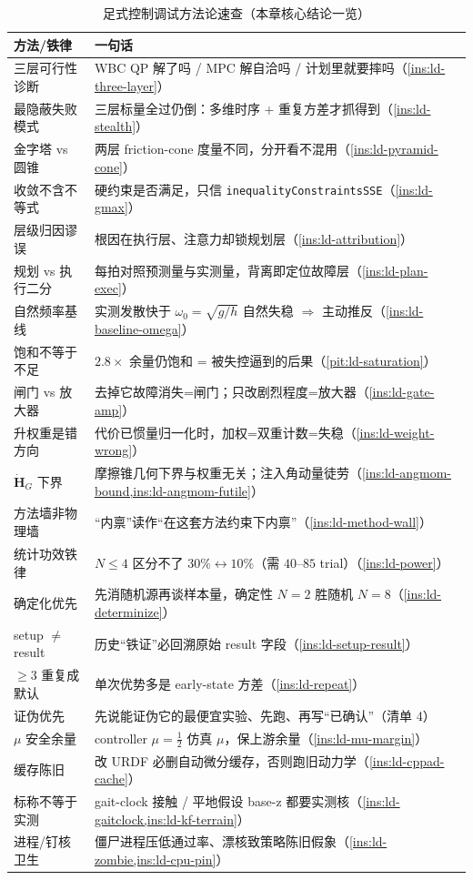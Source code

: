 \begin{table}[H]\centering\small
\caption{足式控制调试方法论速查（本章核心结论一览）}
\begin{tabular}{p{} p{}}
\toprule
方法/铁律 & 一句话 \\
\midrule
三层可行性诊断 & WBC QP 解了吗 / MPC 解自洽吗 / 计划里就要摔吗（\cref{ins:ld-three-layer}）\\
最隐蔽失败模式 & 三层标量全过仍倒：多维时序 + 重复方差才抓得到（\cref{ins:ld-stealth}）\\
金字塔 vs 圆锥 & 两层 friction-cone 度量不同，分开看不混用（\cref{ins:ld-pyramid-cone}）\\
收敛不含不等式 & 硬约束是否满足，只信 \texttt{inequalityConstraintsSSE}（\cref{ins:ld-gmax}）\\
层级归因谬误 & 根因在执行层、注意力却锁规划层（\cref{ins:ld-attribution}）\\
规划 vs 执行二分 & 每拍对照预测量与实测量，背离即定位故障层（\cref{ins:ld-plan-exec}）\\
自然频率基线 & 实测发散快于 $\omega_0=\sqrt{g/h}$ 自然失稳 $\Rightarrow$ 主动推反（\cref{ins:ld-baseline-omega}）\\
饱和不等于不足 & $2.8\times$ 余量仍饱和 = 被失控逼到的后果（\cref{pit:ld-saturation}）\\
闸门 vs 放大器 & 去掉它故障消失=闸门；只改剧烈程度=放大器（\cref{ins:ld-gate-amp}）\\
升权重是错方向 & 代价已惯量归一化时，加权=双重计数=失稳（\cref{ins:ld-weight-wrong}）\\
$\dot{\boldsymbol H}_G$ 下界 & 摩擦锥几何下界与权重无关；注入角动量徒劳（\cref{ins:ld-angmom-bound,ins:ld-angmom-futile}）\\
方法墙非物理墙 & “内禀”读作“在这套方法约束下内禀”（\cref{ins:ld-method-wall}）\\
统计功效铁律 & $N\le 4$ 区分不了 $30\%{\leftrightarrow}10\%$（需 $40$--$85$ trial）（\cref{ins:ld-power}）\\
确定化优先 & 先消随机源再谈样本量，确定性 $N{=}2$ 胜随机 $N{=}8$（\cref{ins:ld-determinize}）\\
setup $\ne$ result & 历史“铁证”必回溯原始 result 字段（\cref{ins:ld-setup-result}）\\
$\ge 3$ 重复成默认 & 单次优势多是 early-state 方差（\cref{ins:ld-repeat}）\\
证伪优先 & 先说能证伪它的最便宜实验、先跑、再写“已确认”（清单 4）\\
$\mu$ 安全余量 & controller $\mu=\tfrac12$ 仿真 $\mu$，保上游余量（\cref{ins:ld-mu-margin}）\\
缓存陈旧 & 改 URDF 必删自动微分缓存，否则跑旧动力学（\cref{ins:ld-cppad-cache}）\\
标称不等于实测 & gait-clock 接触 / 平地假设 base-z 都要实测核（\cref{ins:ld-gaitclock,ins:ld-kf-terrain}）\\
进程/钉核卫生 & 僵尸进程压低通过率、漂核致策略陈旧假象（\cref{ins:ld-zombie,ins:ld-cpu-pin}）\\
\bottomrule
\end{tabular}
\label{tab:ld-cheatsheet}
\end{table}

